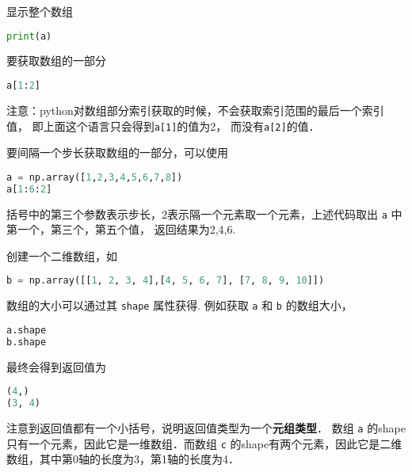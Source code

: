 显示整个数组
\begin{lstlisting}[language=python]
print(a)
\end{lstlisting}
要获取数组的一部分
\begin{lstlisting}[language=python]
a[1:2]
\end{lstlisting}
注意：python对数组部分索引获取的时候，不会获取索引范围的最后一个索引值， 即上面这个语言只会得到\verb|a[1]|的值为2， 而没有\verb|a[2]|的值．

要间隔一个步长获取数组的一部分，可以使用
\begin{lstlisting}[language=python]
a = np.array([1,2,3,4,5,6,7,8])
a[1:6:2]
\end{lstlisting}
括号中的第三个参数表示步长，2表示隔一个元素取一个元素，上述代码取出 \verb|a| 中第一个，第三个，第五个值， 返回结果为2,4,6.

创建一个二维数组，如
\begin{lstlisting}[language=python]
b = np.array([[1, 2, 3, 4],[4, 5, 6, 7], [7, 8, 9, 10]])
\end{lstlisting}
数组的大小可以通过其 \verb|shape| 属性获得. 例如获取 \verb|a| 和 \verb|b| 的数组大小，
\begin{lstlisting}[language=python]
a.shape
b.shape
\end{lstlisting}
最终会得到返回值为
\begin{lstlisting}[language=python]
(4,)
(3, 4)
\end{lstlisting}
注意到返回值都有一个小括号，说明返回值类型为一个\textbf{元组类型}． 数组 \verb|a| 的shape只有一个元素，因此它是一维数组．而数组 \verb|c| 的shape有两个元素，因此它是二维数组，其中第0轴的长度为3，第1轴的长度为4．


